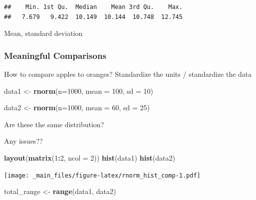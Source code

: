 \documentclass[
]{book}
\newenvironment{Shaded}{\begin{snugshade}}{\end{snugshade}}
\newcommand{\AttributeTok}[1]{\textcolor[rgb]{0.13,0.29,0.53}{#1}}
\newcommand{\DecValTok}[1]{\textcolor[rgb]{0.00,0.00,0.81}{#1}}
\newcommand{\FunctionTok}[1]{\textcolor[rgb]{0.13,0.29,0.53}{\textbf{#1}}}
\newcommand{\NormalTok}[1]{#1}
\newcommand{\OtherTok}[1]{\textcolor[rgb]{0.56,0.35,0.01}{#1}}
\newcommand{\SpecialCharTok}[1]{\textcolor[rgb]{0.81,0.36,0.00}{\textbf{#1}}}
\begin{document}
\begin{verbatim}
##    Min. 1st Qu.  Median    Mean 3rd Qu.    Max. 
##   7.679   9.422  10.149  10.144  10.748  12.745
\end{verbatim}

Mean, standard deviation

\hypertarget{meaningful-comparisons}{%
\subsubsection{Meaningful Comparisons}\label{meaningful-comparisons}}

How to compare apples to oranges? Standardize the units / standardize the data

\begin{Shaded}
\begin{Highlighting}[]
\NormalTok{data1 }\OtherTok{\textless{}{-}} \FunctionTok{rnorm}\NormalTok{(}\AttributeTok{n=}\DecValTok{1000}\NormalTok{, }
              \AttributeTok{mean =} \DecValTok{100}\NormalTok{,}
              \AttributeTok{sd =} \DecValTok{10}\NormalTok{)}

\NormalTok{data2 }\OtherTok{\textless{}{-}} \FunctionTok{rnorm}\NormalTok{(}\AttributeTok{n=}\DecValTok{1000}\NormalTok{,}
               \AttributeTok{mean =} \DecValTok{60}\NormalTok{, }
               \AttributeTok{sd =} \DecValTok{25}\NormalTok{)}
\end{Highlighting}
\end{Shaded}

Are these the same distribution?

Any issues??

\begin{Shaded}
\begin{Highlighting}[]
\FunctionTok{layout}\NormalTok{(}\FunctionTok{matrix}\NormalTok{(}\DecValTok{1}\SpecialCharTok{:}\DecValTok{2}\NormalTok{, }\AttributeTok{ncol =} \DecValTok{2}\NormalTok{))}
\FunctionTok{hist}\NormalTok{(data1)}
\FunctionTok{hist}\NormalTok{(data2)}
\end{Highlighting}
\end{Shaded}

\texttt{[image: \_main\_files/figure-latex/rnorm\_hist\_comp-1.pdf]}

\begin{Shaded}
\begin{Highlighting}[]
\NormalTok{total\_range }\OtherTok{\textless{}{-}} \FunctionTok{range}\NormalTok{(data1, data2)}
\end{Highlighting}
\end{Shaded}
\end{document}
